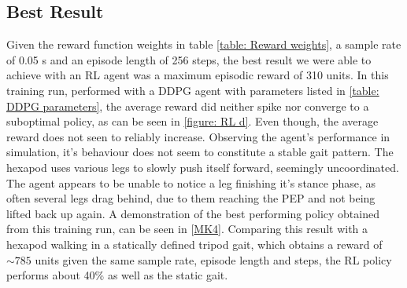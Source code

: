 \subsection{Best Result}
Given the reward function weights in table \ref{table: Reward weights}, a sample rate of 0.05 s and an episode length of 256 steps, the best result we were able to achieve with an RL agent was a maximum episodic reward of 310 units.
In this training run, performed with a DDPG agent with parameters listed in \ref{table: DDPG parameters}, the average reward did neither spike nor converge to a suboptimal policy, as can be seen in \ref{figure: RL d}.
Even though, the average reward does not seen to reliably increase.
Observing the agent's performance in simulation, it's behaviour does not seem to constitute a stable gait pattern.
The hexapod uses various legs to slowly push itself forward, seemingly uncoordinated.
The agent appears to be unable to notice a leg finishing it's stance phase, as often several legs drag behind, due to them reaching the PEP and not being lifted back up again.
A demonstration of the best performing policy obtained from this training run, can be seen in [\hyperref[vid: MK4]{MK4}].
Comparing this result with a hexapod walking in a statically defined tripod gait, which obtains a reward of $\sim785$ units given the same sample rate, episode length and steps, the RL policy performs about 40\% as well as the static gait.


